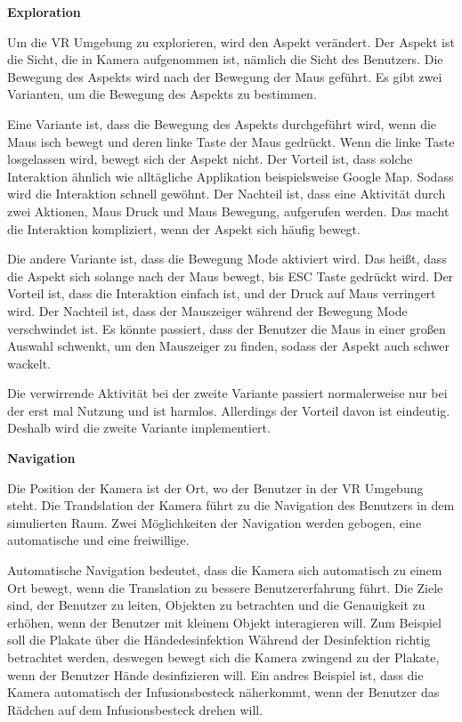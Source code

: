   \textbf{Exploration}
  
  Um die VR Umgebung zu explorieren, wird den Aspekt verändert. Der Aspekt ist die Sicht, die in Kamera aufgenommen ist, nämlich die Sicht des Benutzers. Die Bewegung des Aspekts wird nach der Bewegung der Maus geführt. Es gibt zwei Varianten, um die Bewegung des Aspekts zu bestimmen.
  
  Eine Variante ist, dass die Bewegung des Aspekts durchgeführt wird, wenn die Maus isch bewegt und deren linke Taste der Maus gedrückt. Wenn die linke Taste losgelassen wird, bewegt sich der Aspekt nicht. Der Vorteil ist, dass solche Interaktion ähnlich wie alltägliche Applikation beispielsweise Google Map. Sodass wird die Interaktion schnell gewöhnt. Der Nachteil ist, dass eine Aktivität durch zwei Aktionen, Maus Druck und Maus Bewegung, aufgerufen werden. Das macht die Interaktion kompliziert, wenn der Aspekt sich häufig bewegt.
  
  Die andere Variante ist, dass die Bewegung Mode aktiviert wird. Das heißt, dass die Aspekt sich solange nach der Maus bewegt, bis ESC Taste gedrückt wird. Der Vorteil ist, dass die Interaktion einfach ist, und der Druck auf Maus verringert wird. Der Nachteil ist, dass der Mauszeiger während der Bewegung Mode verschwindet ist. Es könnte passiert, dass der Benutzer die Maus in einer großen Auswahl schwenkt, um den Mauszeiger zu finden, sodass der Aspekt auch schwer wackelt.
  
  Die verwirrende Aktivität bei der zweite Variante passiert normalerweise nur bei der erst mal Nutzung und ist harmlos. Allerdings der Vorteil davon ist eindeutig. Deshalb wird die zweite Variante implementiert.
  
  \textbf{Navigation}
  
  Die Position der Kamera ist der Ort, wo der Benutzer in der VR Umgebung steht. Die Trandslation der Kamera führt zu die Navigation des Benutzers in dem simulierten Raum. Zwei Möglichkeiten der Navigation werden gebogen, eine automatische und eine freiwillige.
  
  Automatische Navigation bedeutet, dass die Kamera sich automatisch zu einem Ort bewegt, wenn die Translation zu bessere Benutzererfahrung führt. Die Ziele sind, der Benutzer zu leiten, Objekten zu betrachten und die Genauigkeit zu erhöhen, wenn der Benutzer mit kleinem Objekt interagieren will. Zum Beispiel soll die Plakate über die Händedesinfektion Während der Desinfektion richtig betrachtet werden, deswegen bewegt sich die Kamera zwingend zu der Plakate, wenn der Benutzer Hände desinfizieren will. Ein andres Beispiel ist, dass die Kamera automatisch der Infusionsbesteck näherkommt, wenn der Benutzer das Rädchen auf dem Infusionsbesteck drehen will.

